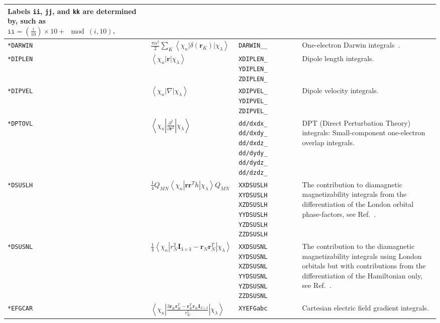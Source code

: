 \documentclass[a4paper,11pt,twoside,openright]{book}
\newcommand{\propint}[1]{\left\langle\chi_{\kappa}\left|#1\right|\chi_{\lambda}\right\rangle}
\begin{document}
\begin{landscape}
\begin{center}
\begin{longtable}{p{1.8cm}|p{6.5cm}|p{2.2cm}|p{11cm}}
      Labels \verb|ii|, \verb|jj|, and \verb|kk| are determined by, such as
      $\mathtt{ii}=\left(\frac{i}{10}\right)\times10+\mod(i,10)$.\\
  \hline
%
  \texttt{*DARWIN}
  & $\frac{\pi\alpha^{2}}{2}\sum_K\propint{\delta\left(\mathbf{r}_K\right)}$
  & \verb|DARWIN__|
  & One-electron Darwin integrals~\cite{skjohjajjcp103}.\\
  \hline
%
  \texttt{*DIPLEN}
  & $\propint{\mathbf{r}}$
  & \verb|XDIPLEN_| \verb|YDIPLEN_| \verb|ZDIPLEN_|
  & Dipole length integrals.\\
  \hline
%
  \texttt{*DIPVEL}
  & $\propint{\nabla}$
  & \verb|XDIPVEL_| \verb|YDIPVEL_| \verb|ZDIPVEL_|
  & Dipole velocity integrals.\\
  \hline
%
  \texttt{*DPTOVL}
  & $\propint{\frac{\partial^2}{\partial\mathbf{r}^2}}$
  & \verb|dd/dxdx_| \verb|dd/dxdy_| \verb|dd/dxdz_|
     \verb|dd/dydy_| \verb|dd/dydz_| \verb|dd/dzdz_|
  & DPT (Direct Perturbation Theory) integrals: Small-component
     one-electron overlap integrals.\\
  \hline
%
  \texttt{*DSUSLH}
  & $\frac{1}{4}Q_{MN}\propint{\mathbf{r}\mathbf{r}^{T}h}Q_{MN}$
  & \verb|XXDSUSLH| \verb|XYDSUSLH| \verb|XZDSUSLH|
     \verb|YYDSUSLH| \verb|YZDSUSLH| \verb|ZZDSUSLH|
  & The contribution to diamagnetic magnetizability integrals from the
     differentiation of the London orbital phase-factors, see Ref.~\cite{thpjjcp95}.\\
  \hline
%
%
  \texttt{*DSUSNL}
  & $\frac{1}{4}\propint{r_N^2\mathbf{I}_{3\times3}-\mathbf{r}_N\mathbf{r}_N^T}$
  & \verb|XXDSUSNL| \verb|XYDSUSNL| \verb|XZDSUSNL|
     \verb|YYDSUSNL| \verb|YZDSUSNL| \verb|ZZDSUSNL|
  & The contribution to the diamagnetic magnetizability integrals
     using London orbitals but with contributions from the differentiation
     of the Hamiltonian only, see Ref.~\cite{thpjjcp95}.\\
  \hline
%
  \texttt{*EFGCAR}
  & $\propint{\frac{3\mathbf{r}_K\mathbf{r}_K^T-\mathbf{r}_K^T\mathbf{r}_K\mathbf{I}_{3\times3}}{r_K^5}}$
  & \verb|XYEFGabc|
  & Cartesian electric field gradient integrals.


\end{longtable}
\end{center}
\end{landscape}
\end{document}
